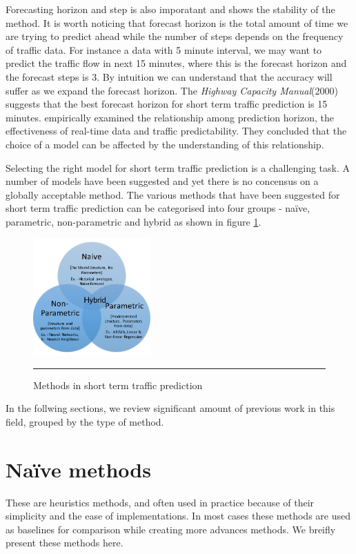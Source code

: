 Forecasting horizon and step is also imporatant and shows the stability of the method. It is worth
noticing that forecast horizon is the total amount of time we are trying to predict ahead while
the number of steps depends on the frequency of traffic data. For instance a data with 5 minute interval,
we may want to predict the traffic flow in next 15 minutes, where this is the forecast horizon and the
forecast steps is 3. By intuition we can understand that the accuracy will suffer as we expand the
forecast horizon. The \textit{Highway Capacity Manual}(2000) suggests that the best forecast horizon
for short term traffic prediction is 15 minutes. \citet{yue2007prediction} empirically examined the
relationship among prediction horizon, the effectiveness of real-time data and traffic predictability.
They concluded that the choice of a model can be affected by the understanding of this relationship.


Selecting the right model for short term traffic prediction is a challenging task. A number of
models have been suggested and yet there is no concensus on a globally acceptable method.
The various methods that have been suggested for short term traffic prediction can be categorised into four
groups - naïve, parametric, non-parametric and hybrid as shown in figure \ref{fig:sttp-methods}.

\begin{figure}[htbp]
  \centering
    \includegraphics[width=0.4\textwidth,height=0.4\textheight,keepaspectratio]{Figures/sttp-methods.pdf}
    \rule{35em}{0.5pt}
  \caption[Methods in short term traffic prediction]{Methods in short term traffic prediction}
  \label{fig:sttp-methods}
\end{figure}

In the follwing sections, we review significant amount of previous work in this field, grouped by the
type of method.

\section{Naïve methods}
These are heuristics methods, and often used in practice because of their simplicity and the ease
of implementations. In most cases these methods are used as baselines for comparison while
creating more advances methods. We breifly present these methods here.

